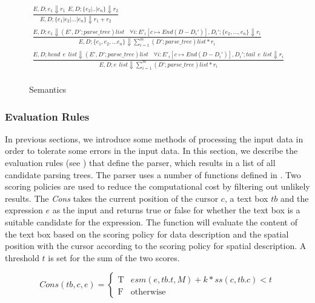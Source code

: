 \begin{figure*}[!ht]
\begin{gather*}
  \frac
  {E,D;e_1 \Downarrow r_1 ~~ E,D;\{e_2|..|e_n\} \Downarrow r_2}
  {E,D;\{e_1|e_2|...|e_n\} \Downarrow r_1+r_2}\\
  \tag{\sc E-Sturct}\label{rule:struct}
  \frac
  {E,D;e_1 \Downarrow (E',D';parse\_tree)list~~~~  \forall i:  E'_i[c \mapsto End(D-D_i')],D_i';\{e_2,...,e_n\} \Downarrow r_i}
  {E,D;\{e_1,e_2,...e_n\} \Downarrow \sum_{i=1}^{m} (D';parse\_tree)list*r_i}\\
  \tag{\sc E-List}\label{rule:list}
  \frac
  {E,D;head ~~e~~list \Downarrow (E',D';parse\_tree)list ~~~~ \forall i:  E'_i[c \mapsto End(D-D_i')],D_i';tail~~e~~list \Downarrow r_i}
  {E,D;e~~list \Downarrow \sum_{i=1}^{m} (D';parse\_tree)list*r_i}\\
\end{gather*}
\caption{Semantics}\label{fig:semantics}
\end{figure*}


\subsubsection{Evaluation Rules}

In previous sections, we introduce some methods of processing the input 
data in order to tolerate some errors in the input data. 
In this section, we describe the evaluation rules (see ) 
that define the parser, which results in a list of all candidate parsing trees. 
The parser uses a number of functions defined in . 
Two scoring policies are used to reduce the computational cost 
by filtering out unlikely results. 
The {\em Cons} takes the current position of the cursor $c$, 
a text box $tb$ and the expression $e$ as the input 
and returns true or false for whether the text box is a 
suitable candidate for the expression. 
The function will evaluate the content of the text box based on 
the scoring policy for data description and the spatial position 
with the cursor according to the scoring policy for spatial description. 
A threshold $t$ is set for the sum of the two scores.

\begin{equation}
Cons(tb, c, e) = 
\begin{cases}
\text{T}& \text{$esm(e, tb.t, M)+k*ss(c, tb.c) < t$}\\
\text{F}& \text{otherwise}
\end{cases}
\label{equ:constraint}
\end{equation}


